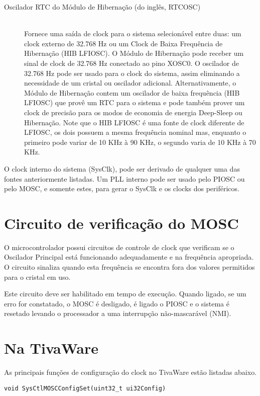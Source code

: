 \begin{description}
	\item [Oscilador RTC do Módulo de Hibernação (do inglês, RTCOSC)]\hfill \\
	Fornece uma saída de clock para o sistema selecionável entre duas: um clock externo de 32.768 Hz ou um Clock de Baixa Frequência de Hibernação (HIB LFIOSC). O Módulo de Hibernação pode receber um sinal de clock de 32.768 Hz conectado ao pino XOSC0. O oscilador de 32.768 Hz pode ser usado para o clock do sistema, assim eliminando a necessidade de um cristal ou oscilador adicional. Alternativamente, o Módulo de Hibernação contem um oscilador de baixa frequência (HIB LFIOSC) que provê um RTC para o sistema e pode também prover um clock de precisão para os modos de economia de energia Deep-Sleep ou Hibernação. Note que o HIB LFIOSC é uma fonte de clock diferente de LFIOSC, os dois possuem a mesma frequência nominal mas, enquanto o primeiro pode variar de 10 KHz à 90 KHz, o segundo varia de 10 KHz à 70 KHz.
\end{description}

O clock interno do sistema (SysClk), pode ser derivado de qualquer uma das fontes anteriormente listadas. Um PLL interno pode ser usado pelo PIOSC ou pelo MOSC, e somente estes, para gerar o SysClk e os clocks dos periféricos.

\section{Circuito de verificação do MOSC}

O microcontrolador possui circuitos de controle de clock que verificam se o Oscilador Principal está funcionando adequadamente e na frequência apropriada. O circuito sinaliza quando esta frequência se encontra fora dos valores permitidos para o cristal em uso.

Este circuito deve ser habilitado em tempo de execução. Quando ligado, se um erro for constatado, o MOSC é desligado, é ligado o PIOSC e o sistema é resetado levando o processador a uma interrupção não-mascarável (NMI).


\section{Na TivaWare}

As principais funções de configuração do clock no TivaWare estão listadas abaixo.

\begin{lstlisting}[style=funcao]
	void SysCtlMOSCConfigSet(uint32_t ui32Config)
\end{lstlisting}


